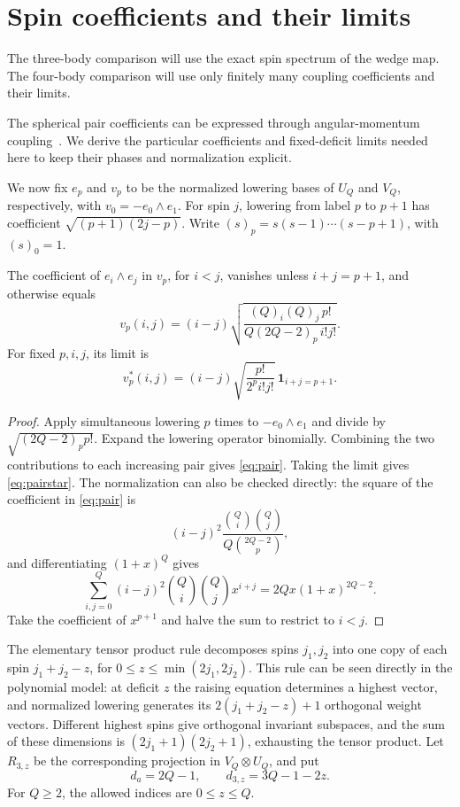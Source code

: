 \section{Spin coefficients and their limits}
\label{sec:spin}
The three-body comparison will use the exact spin spectrum of the wedge map. The four-body comparison will use only finitely many coupling coefficients and their limits.

The spherical pair coefficients can be expressed through angular-momentum
coupling~\cite[Section~II.C and Appendix~A]{OrtizNussinovDukelskySeidel}.
We derive the particular coefficients and fixed-deficit limits needed
here to keep their phases and normalization explicit.

We now fix $e_p$ and $v_p$ to be the normalized lowering bases of $U_Q$ and $V_Q$, respectively, with $v_0=-e_0\wedge e_1$. For spin $j$, lowering from label $p$ to $p+1$ has coefficient $\sqrt{(p+1)(2j-p)}$. Write $(s)_p=s(s-1)\cdots(s-p+1)$, with $(s)_0=1$.

\begin{lemma}\label{lem:pair}
The coefficient of $e_i\wedge e_j$ in $v_p$, for $i<j$, vanishes unless $i+j=p+1$, and otherwise equals
\begin{equation}\label{eq:pair}
 v_p(i,j)=(i-j)\sqrt{\frac{(Q)_i(Q)_j\,p!}{Q(2Q-2)_p\,i!j!}}.
\end{equation}
For fixed $p,i,j$, its limit is
\begin{equation}\label{eq:pairstar}
 v_p^*(i,j)=(i-j)\sqrt{\frac{p!}{2^p i!j!}}\,\mathbf1_{i+j=p+1}.
\end{equation}
\end{lemma}
\begin{proof}
Apply simultaneous lowering $p$ times to $-e_0\wedge e_1$ and divide by $\sqrt{(2Q-2)_p p!}$. Expand the lowering operator binomially. Combining the two contributions to each increasing pair gives \eqref{eq:pair}. Taking the limit gives \eqref{eq:pairstar}.
The normalization can also be checked directly: the square of the
coefficient in \eqref{eq:pair} is
\[
 (i-j)^2\frac{\binom Qi\binom Qj}{Q\binom{2Q-2}{p}},
\]
and differentiating \((1+x)^Q\) gives
\[
 \sum_{i,j=0}^Q(i-j)^2\binom Qi\binom Qj x^{i+j}
 =2Qx(1+x)^{2Q-2}.
\]
Take the coefficient of \(x^{p+1}\) and halve the sum to restrict to \(i<j\).
\end{proof}

The elementary tensor product rule decomposes spins $j_1,j_2$ into one copy of each spin $j_1+j_2-z$, for $0\le z\le\min(2j_1,2j_2)$. This rule can be seen directly in the
polynomial model: at deficit $z$ the raising equation determines a highest
vector, and normalized lowering generates its $2(j_1+j_2-z)+1$
orthogonal weight vectors. Different highest spins give orthogonal
invariant subspaces, and the sum of these dimensions is
$(2j_1+1)(2j_2+1)$, exhausting the tensor product. Let $R_{3,z}$ be the corresponding projection in $V_Q\otimes U_Q$, and put
\[
 d_a=2Q-1,\qquad d_{3,z}=3Q-1-2z.
\]
For $Q\ge2$, the allowed indices are $0\le z\le Q$.

